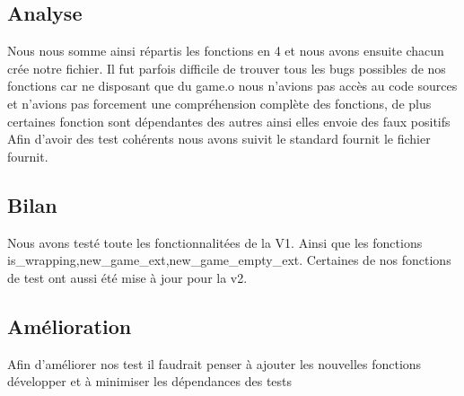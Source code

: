 \documentclass[12pt]{article}
\begin{document}
\subsection{Analyse}
Nous nous somme ainsi répartis les fonctions en 4 et nous avons ensuite chacun crée notre fichier.
Il fut parfois difficile de trouver tous les bugs possibles de nos fonctions car ne disposant que du game.o
nous n'avions pas accès au code sources et n'avions pas forcement une compréhension complète des fonctions, 
de plus certaines fonction sont dépendantes des autres ainsi elles envoie des faux positifs
Afin d'avoir des test cohérents nous avons suivit le standard fournit le fichier fournit.
\subsection{Bilan}
Nous avons testé toute les fonctionnalitées de la V1. Ainsi que les fonctions is\_wrapping,new\_game\_ext,new\_game\_empty\_ext.
Certaines de nos fonctions de test ont aussi été mise à jour pour la v2.
\subsection{Amélioration}
Afin d'améliorer nos test il faudrait penser à ajouter les nouvelles fonctions développer et à minimiser les dépendances des tests

%
\end{document}

